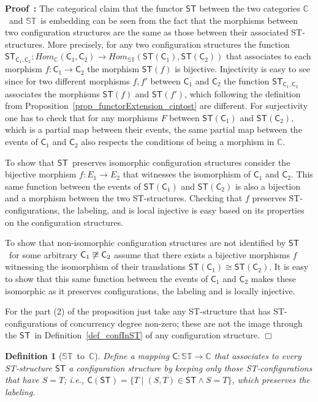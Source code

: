 \documentclass[submission,copyright,creativecommons]{eptcs}
\newtheorem{definition}[theorem]{Definition}
\newenvironment{proof}[1][\!\!\,]{\vspace{1ex}\noindent\textbf{Proof #1: }}{\hfill$\Box$\vspace{2ex}}
\newcommand\C{\ensuremath{\mathsf{C}}}
\newcommand\allC{\ensuremath{\mathbb{C}}}
\newcommand\allST{\ensuremath{\mathbb{ST}}}
\newcommand\isomorphic{\ensuremath{\cong}}
\newcommand\cintost{\ensuremath{\mathsf{ST}}}
\newcommand\stintoc{\ensuremath{\mathsf{C}}}
\begin{document}
\begin{proof}
The categorical claim that the functor $\cintost$ between the two categories \allC\ and \allST\ is embedding can be seen from the fact that the morphisms between two configuration structures are the same as those between their associated ST-structures. More precisely, for any two configuration structures the function $\cintost_{\C_{1},\C_{2}}:\mathit{Hom}_{\allC}(\C_{1},\C_{2})\rightarrow \mathit{Hom}_{\allST}(\cintost(\C_{1}),\cintost(\C_{2}))$ that associates to each morphism $f:\C_{1}\rightarrow\C_{2}$ the morphism $\cintost(f)$ is bijective. Injectivity is easy to see since for two different morphisms $f,f'$ between $\C_{1}$ and $\C_{2}$ the function $\cintost_{\C_{1},\C_{2}}$ associates the morphisms $\cintost(f)$ and $\cintost(f')$, which following the definition from Proposition~\ref{prop_functorExtension_cintost} are different. For surjectivity one has to check that for any morphisms $F$ between $\cintost(\C_{1})$ and $\cintost(\C_{2})$, which is a partial map between their events, the same partial map between the events of $\C_{1}$ and $\C_{2}$ also respects the conditions of being a morphism in \allC.

To show that \cintost\ preserves isomorphic configuration structures consider the bijective morphism $f:E_{1}\rightarrow E_{2}$ that witnesses the isomorphism of $\C_{1}$ and $\C_{2}$. This same function between the events of $\cintost(\C_{1})$ and $\cintost(\C_{2})$ is also a bijection and a morphism between the two ST-structures. Checking that $f$ preserves ST-configurations, the labeling, and is local injective is easy based on its properties on the configuration structures.

To show that non-isomorphic configuration structures are not identified by \cintost\ for some arbitrary $\C_{1}\not\isomorphic\C_{2}$ assume that there exists a bijective morphisms $f$ witnessing the isomorphism of their translations $\cintost(\C_{1})\isomorphic\cintost(\C_{2})$. It is easy to show that this same function between the events of $\C_{1}$ and $\C_{2}$ makes these isomorphic as it preserves configurations, the labeling and is locally injective.

For the part (2) of the proposition just take any ST-structure that has ST-configurations of concurrency degree non-zero; these are not the image through the \cintost\ in Definition~\ref{def_confInST} of any configuration structure.
\end{proof}

\begin{definition}[\allST\ to\ \allC]\label{def_STtoC}
Define a mapping $\stintoc:\allST\!\rightarrow\!\allC$ that associates to every ST-structure $\mathsf{ST}$ a configuration structure by keeping only those ST-configu\-rations that have $S=T$; i.e., $\stintoc(\mathsf{ST})\!=\!\{T \mid (S,T)\!\in\!\mathsf{ST}\wedge S\!=\!T\}$, which preserves the labeling.
\end{definition}
\end{document}
